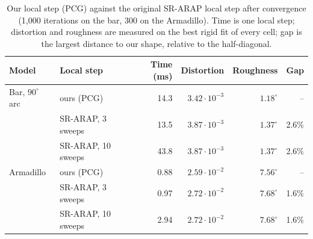 \documentclass{birkjour}
\theoremstyle{remark}
\numberwithin{equation}{section}
\begin{document}
\begin{table}[t]
  \centering
  \caption{Our local step (PCG) against the original SR-ARAP local step after convergence (1{,}000 iterations on the bar, 300 on the Armadillo). Time is one local step; distortion and roughness are measured on the best rigid fit of every cell; gap is the largest distance to our shape, relative to the half-diagonal.}
  \label{tab:srarap}
  {\footnotesize
  \begin{tabular}{llrrrr}
    \toprule
    Model & Local step & Time (ms) & Distortion & Roughness & Gap \\
    \midrule
    Bar, $90^\circ$ arc & ours (PCG) & 14.3 & $3.42 \cdot 10^{-3}$ & $1.18^\circ$ & -- \\
                        & SR-ARAP, 3 sweeps & 13.5 & $3.87 \cdot 10^{-3}$ & $1.37^\circ$ & 2.6\% \\
                        & SR-ARAP, 10 sweeps & 43.8 & $3.87 \cdot 10^{-3}$ & $1.37^\circ$ & 2.6\% \\
    \midrule
    Armadillo & ours (PCG) & 0.88 & $2.59 \cdot 10^{-2}$ & $7.56^\circ$ & -- \\
              & SR-ARAP, 3 sweeps & 0.97 & $2.72 \cdot 10^{-2}$ & $7.68^\circ$ & 1.6\% \\
              & SR-ARAP, 10 sweeps & 2.94 & $2.72 \cdot 10^{-2}$ & $7.68^\circ$ & 1.6\% \\
    \bottomrule
  \end{tabular}}
\end{table}
\end{document}
